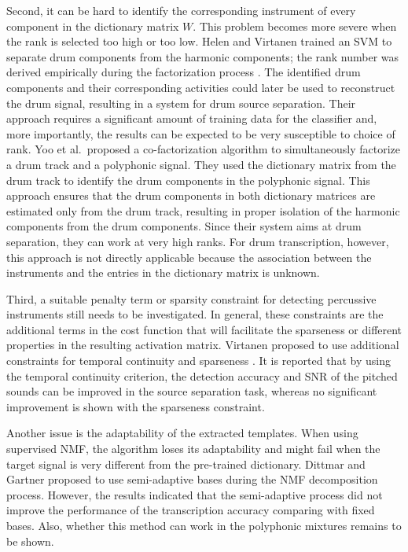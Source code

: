 \documentclass{article}
\begin{document}
Second, it can be hard to identify the corresponding instrument of every component in the dictionary matrix $W$. This problem becomes more severe when the rank is selected too high or too low. Helen and Virtanen trained an SVM to separate drum components from the harmonic components; the rank number was derived empirically during the factorization process \cite{helen_separation_2005}. The identified drum components and their corresponding activities could later be used to reconstruct the drum signal, resulting in a system for drum source separation. Their approach requires a significant amount of training data for the classifier and, more importantly, the results can be expected to be very susceptible to choice of rank. Yoo et al.\ proposed a co-factorization algorithm \cite{yoo_nonnegative_2010} to simultaneously factorize a drum track and a polyphonic signal. They used the dictionary matrix from the drum track to identify the drum components in the polyphonic signal. This approach ensures that the drum components in both dictionary matrices are estimated only from the drum track, resulting in proper isolation of the harmonic components from the drum components. Since their system aims at drum separation, they can work at very high ranks. For drum transcription, however, this approach is not directly applicable because the association between the instruments and the entries in the dictionary matrix is unknown.  

Third, a suitable penalty term or sparsity constraint for detecting percussive instruments still needs to be investigated. In general, these constraints are the additional terms in the cost function that will facilitate the sparseness or different properties in the resulting activation matrix. Virtanen proposed to use additional constraints for temporal continuity and sparseness \cite{virtanen_ssnmf_2007}. It is reported that by using the temporal continuity criterion, the detection accuracy and SNR of the pitched sounds can be improved in the source separation task, whereas no significant improvement is shown with the sparseness constraint. 

Another issue is the adaptability of the extracted templates. When using supervised NMF, the algorithm loses its adaptability and might fail when the target signal is very different from the pre-trained dictionary. Dittmar and Gartner proposed to use semi-adaptive bases during the NMF decomposition process\cite{Dittmar2014}. However, the results indicated that the semi-adaptive process did not improve the performance of the transcription accuracy comparing with fixed bases. Also, whether this method can work in the polyphonic mixtures remains to be shown. 
\end{document}
